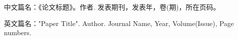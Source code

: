 \documentclass[12pt]{ctexart}
\begin{document}
\begin{bibliography}
  \item 中文篇名：《论文标题》。作者. 发表期刊，发表年，卷(期)，所在页码。
  \item 英文篇名："Paper Title". Author. Journal Name, Year, Volume(Issue), Page numbers.
\end{bibliography}
\end{document}
